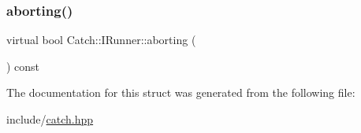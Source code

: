 \subsubsection{\texorpdfstring{aborting()}{aborting()}}
{\footnotesize\ttfamily virtual bool Catch\+::\+I\+Runner\+::aborting (\begin{DoxyParamCaption}{ }\end{DoxyParamCaption}) const\hspace{0.3cm}{\ttfamily [pure virtual]}}



The documentation for this struct was generated from the following file\+:\begin{DoxyCompactItemize}
\item 
include/\mbox{\hyperlink{catch_8hpp}{catch.\+hpp}}\end{DoxyCompactItemize}
